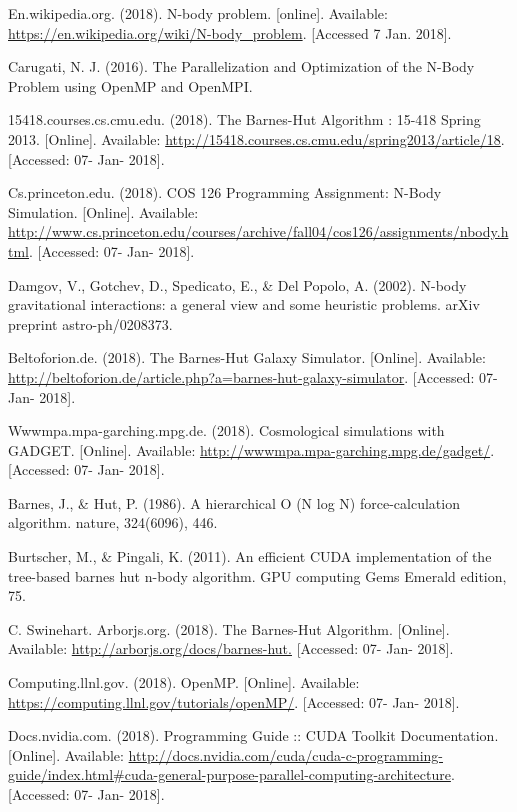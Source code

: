 \documentclass[letterpaper, 10 pt, conference]{ieeeconf}  %
\begin{document}
\begin{thebibliography}{99}

 En.wikipedia.org. (2018). N-body problem. [online]. Available: \url{https://en.wikipedia.org/wiki/N-body_problem}. [Accessed 7 Jan. 2018].

 Carugati, N. J. (2016). The Parallelization and Optimization of the N-Body Problem using OpenMP and OpenMPI.

 15418.courses.cs.cmu.edu. (2018). The Barnes-Hut Algorithm : 15-418 Spring 2013. [Online]. Available: \url{http://15418.courses.cs.cmu.edu/spring2013/article/18}. [Accessed: 07- Jan- 2018].

 Cs.princeton.edu. (2018). COS 126 Programming Assignment: N-Body Simulation.  [Online]. Available: \url{http://www.cs.princeton.edu/courses/archive/fall04/cos126/assignments/nbody.html}. [Accessed: 07- Jan- 2018].

 Damgov, V., Gotchev, D., Spedicato, E., \& Del Popolo, A. (2002). N-body gravitational interactions: a general view and some heuristic problems. arXiv preprint astro-ph/0208373.

 Beltoforion.de. (2018). The Barnes-Hut Galaxy Simulator. [Online]. Available: \url{http://beltoforion.de/article.php?a=barnes-hut-galaxy-simulator}. [Accessed: 07- Jan- 2018].

 Wwwmpa.mpa-garching.mpg.de. (2018). Cosmological simulations with GADGET. [Online]. Available: \url{http://wwwmpa.mpa-garching.mpg.de/gadget/}. [Accessed: 07- Jan- 2018].

 Barnes, J., \& Hut, P. (1986). A hierarchical O (N log N) force-calculation algorithm. nature, 324(6096), 446.

 Burtscher, M., \& Pingali, K. (2011). An efficient CUDA implementation of the tree-based barnes hut n-body algorithm. GPU computing Gems Emerald edition, 75.

 C.  Swinehart. Arborjs.org. (2018). The Barnes-Hut Algorithm.  [Online]. Available: \url{http://arborjs.org/docs/barnes-hut.} [Accessed: 07- Jan- 2018].

 Computing.llnl.gov. (2018). OpenMP. [Online]. Available: \url{https://computing.llnl.gov/tutorials/openMP/}. [Accessed: 07- Jan- 2018].

 Docs.nvidia.com. (2018). Programming Guide :: CUDA Toolkit Documentation. [Online]. Available: \url{http://docs.nvidia.com/cuda/cuda-c-programming-guide/index.html#cuda-general-purpose-parallel-computing-architecture}. [Accessed: 07- Jan- 2018].

\end{thebibliography}
\end{document}

